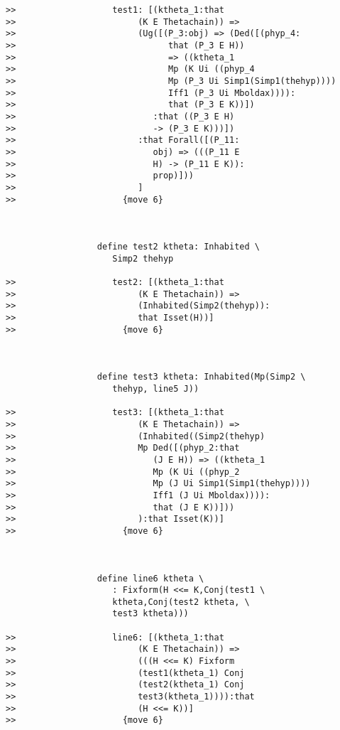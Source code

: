 \documentclass[12pt]{article}
\begin{document}
\begin{verbatim}
>>                   test1: [(ktheta_1:that
>>                        (K E Thetachain)) =>
>>                        (Ug([(P_3:obj) => (Ded([(phyp_4:
>>                              that (P_3 E H))
>>                              => ((ktheta_1
>>                              Mp (K Ui ((phyp_4
>>                              Mp (P_3 Ui Simp1(Simp1(thehyp))))
>>                              Iff1 (P_3 Ui Mboldax)))):
>>                              that (P_3 E K))])
>>                           :that ((P_3 E H)
>>                           -> (P_3 E K)))])
>>                        :that Forall([(P_11:
>>                           obj) => (((P_11 E
>>                           H) -> (P_11 E K)):
>>                           prop)]))
>>                        ]
>>                     {move 6}



                  define test2 ktheta: Inhabited \
                     Simp2 thehyp

>>                   test2: [(ktheta_1:that
>>                        (K E Thetachain)) =>
>>                        (Inhabited(Simp2(thehyp)):
>>                        that Isset(H))]
>>                     {move 6}



                  define test3 ktheta: Inhabited(Mp(Simp2 \
                     thehyp, line5 J))

>>                   test3: [(ktheta_1:that
>>                        (K E Thetachain)) =>
>>                        (Inhabited((Simp2(thehyp)
>>                        Mp Ded([(phyp_2:that
>>                           (J E H)) => ((ktheta_1
>>                           Mp (K Ui ((phyp_2
>>                           Mp (J Ui Simp1(Simp1(thehyp))))
>>                           Iff1 (J Ui Mboldax)))):
>>                           that (J E K))]))
>>                        ):that Isset(K))]
>>                     {move 6}



                  define line6 ktheta \
                     : Fixform(H <<= K,Conj(test1 \
                     ktheta,Conj(test2 ktheta, \
                     test3 ktheta)))

>>                   line6: [(ktheta_1:that
>>                        (K E Thetachain)) =>
>>                        (((H <<= K) Fixform
>>                        (test1(ktheta_1) Conj
>>                        (test2(ktheta_1) Conj
>>                        test3(ktheta_1)))):that
>>                        (H <<= K))]
>>                     {move 6}




\end{verbatim}
\end{document}
